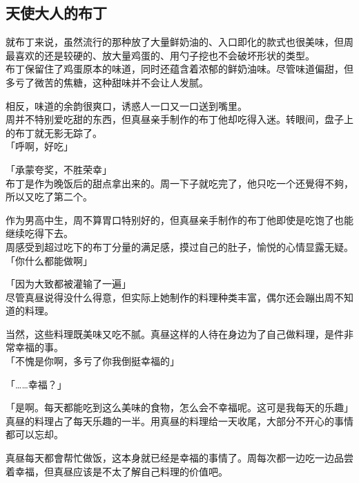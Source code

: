 \subsection{天使大人的布丁}

就布丁来说，虽然流行的那种放了大量鲜奶油的、入口即化的款式也很美味，但周最喜欢的还是较硬的、放大量鸡蛋的、用勺子挖也不会破坏形状的类型。\\

布丁保留住了鸡蛋原本的味道，同时还蕴含着浓郁的鲜奶油味。尽管味道偏甜，但多亏了微苦的焦糖，这种甜味并不会让人发腻。

相反，味道的余韵很爽口，诱惑人一口又一口送到嘴里。\\

周并不特别爱吃甜的东西，但真昼亲手制作的布丁他却吃得入迷。转眼间，盘子上的布丁就无影无踪了。\\

「呼啊，好吃」

「承蒙夸奖，不胜荣幸」\\

布丁是作为晚饭后的甜点拿出来的。周一下子就吃完了，他只吃一个还覺得不夠，所以又吃了第二个。

作为男高中生，周不算胃口特别好的，但真昼亲手制作的布丁他即使是吃饱了也能继续吃得下去。\\

周感受到超过吃下的布丁分量的满足感，摸过自己的肚子，愉悦的心情显露无疑。\\

「你什么都能做啊」

「因为大致都被灌输了一遍」\\

尽管真昼说得没什么得意，但实际上她制作的料理种类丰富，偶尔还会蹦出周不知道的料理。%

当然，这些料理既美味又吃不腻。真昼这样的人待在身边为了自己做料理，是件非常幸福的事。\\

「不愧是你啊，多亏了你我倒挺幸福的」

「……幸福？」

「是啊。每天都能吃到这么美味的食物，怎么会不幸福呢。这可是我每天的乐趣」\\

真昼的料理占了每天乐趣的一半。用真昼的料理给一天收尾，大部分不开心的事情都可以忘却。

真昼每天都會帮忙做饭，这本身就已经是幸福的事情了。周每次都一边吃一边品尝着幸福，但真昼应该是不太了解自己料理的价值吧。\\

